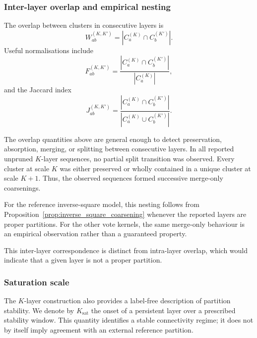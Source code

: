 \documentclass[pdflatex,sn-basic,Numbered]{sn-jnl}
\begin{document}
\subsubsection{Inter-layer overlap and empirical nesting}

The overlap between clusters in consecutive layers is
\begin{equation}
W_{ab}^{(K,K')}
=
|C_a^{(K)}\cap C_b^{(K')}|.
\label{eq:overlap_count}
\end{equation}
Useful normalisations include
\begin{equation}
F_{ab}^{(K,K')}
=
\frac{
|C_a^{(K)}\cap C_b^{(K')}|
}{
|C_a^{(K)}|
},
\label{eq:frac_from}
\end{equation}
and the Jaccard index
\begin{equation}
J_{ab}^{(K,K')}
=
\frac{
|C_a^{(K)}\cap C_b^{(K')}|
}{
|C_a^{(K)}\cup C_b^{(K')}|
}.
\label{eq:jaccard}
\end{equation}

The overlap quantities above are general enough to detect preservation,
absorption, merging, or splitting between consecutive layers. In all
reported unpruned $K$-layer sequences, no partial split transition was
observed. Every cluster at scale $K$ was
either preserved or wholly contained in a unique cluster at scale $K+1$.
Thus, the observed sequences formed successive merge-only coarsenings.

For the reference inverse-square model, this nesting follows from
Proposition~\ref{prop:inverse_square_coarsening} whenever the reported layers
are proper partitions. For the other vote kernels, the same merge-only
behaviour is an empirical observation rather than a guaranteed property.

This inter-layer correspondence is distinct from intra-layer overlap, which
would indicate that a given layer is not a proper partition.


\subsubsection{Saturation scale}

The $K$-layer construction also provides a label-free description of
partition stability. We denote by $K_{\mathrm{sat}}$ the onset of a
persistent layer over a prescribed stability window. This quantity
identifies a stable connectivity regime; it does not by itself imply
agreement with an external reference partition.
\end{document}
